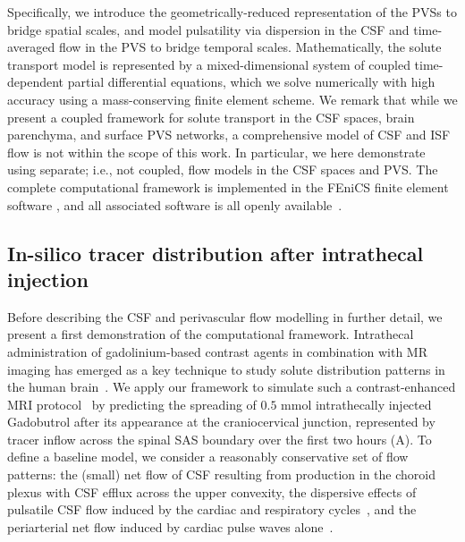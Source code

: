 \documentclass[fleqn,10pt]{wlscirep}
\begin{document}
Specifically, we
introduce the geometrically-reduced representation of the PVSs to
bridge spatial scales, and model pulsatility via dispersion in the CSF
and time-averaged flow in the PVS to bridge temporal
scales. Mathematically, the solute transport model is represented by a
mixed-dimensional system of coupled time-dependent partial
differential equations\cite{masri2024modelling}, which we solve
numerically with high accuracy using a mass-conserving finite element
scheme. We remark that while we present a coupled framework for solute
transport in the CSF spaces, brain parenchyma, and surface PVS networks, a
comprehensive model of CSF and ISF flow is not within the scope of
this work. In particular, we here demonstrate using separate; i.e.,
not coupled, flow models in the CSF spaces and PVS. The complete
computational framework is implemented in the FEniCS finite element
software \cite{alnaes2015fenics, kuchta2020assembly}, and all
associated software is all openly available~\cite{ZENODO}.

\subsection*{In-silico tracer distribution after intrathecal injection}

Before describing the CSF and perivascular flow modelling in further
detail, we present a first demonstration of the computational
framework. Intrathecal administration of gadolinium-based contrast
agents in combination with MR imaging has emerged as a key technique
to study solute distribution patterns in the human
brain~\cite{ringstad2017glymphatic, ringstad2018brain,
  eide2024functional, van2024human, kipnis2025resolving}. We apply our
framework to simulate such a contrast-enhanced MRI
protocol~\cite{ringstad2018brain} by predicting the spreading of $0.5$
mmol intrathecally injected Gadobutrol after its appearance at the
craniocervical junction, represented by tracer inflow across the
spinal SAS boundary over the first two hours
(A). To define a baseline model, we consider a
reasonably conservative set of flow patterns: the (small) net flow of
CSF resulting from production in the choroid plexus with CSF efflux across the upper convexity\cite{hornkjol2022csf}, the dispersive effects of pulsatile
CSF flow induced by the cardiac and respiratory
cycles~\cite{sweetman2011cerebrospinal, vinje2019respiratory}, and the
periarterial net flow induced by cardiac pulse waves
alone~\cite{mestre2018flow, gjerde2023directional}.
\end{document}
